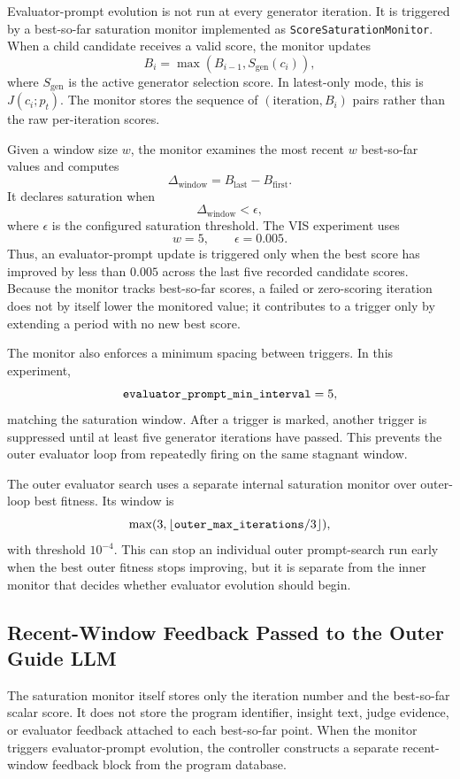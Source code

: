 \documentclass[11pt]{article}
\begin{document}
Evaluator-prompt evolution is not run at every generator iteration. It is
triggered by a best-so-far saturation monitor implemented as
\texttt{ScoreSaturationMonitor}. When a child candidate receives a valid score,
the monitor updates
\[
  B_i = \max(B_{i-1}, S_{\mathrm{gen}}(c_i)),
\]
where \(S_{\mathrm{gen}}\) is the active generator selection score. In
latest-only mode, this is \(J(c_i; p_t)\). The monitor stores the sequence of
\((\text{iteration}, B_i)\) pairs rather than the raw per-iteration scores.

Given a window size \(w\), the monitor examines the most recent \(w\)
best-so-far values and computes
\[
  \Delta_{\mathrm{window}}
    = B_{\mathrm{last}} - B_{\mathrm{first}}.
\]
It declares saturation when
\[
  \Delta_{\mathrm{window}} < \epsilon,
\]
where \(\epsilon\) is the configured saturation threshold. The VIS experiment
uses
\[
  w = 5,\qquad \epsilon = 0.005.
\]
Thus, an evaluator-prompt update is triggered only when the best score has
improved by less than \(0.005\) across the last five recorded candidate scores.
Because the monitor tracks best-so-far scores, a failed or zero-scoring
iteration does not by itself lower the monitored value; it contributes to a
trigger only by extending a period with no new best score.

The monitor also enforces a minimum spacing between triggers. In this
experiment,
\[
  \text{\texttt{evaluator\_prompt\_min\_interval}} = 5,
\]
matching the saturation window. After a trigger is marked, another trigger is
suppressed until at least five generator iterations have passed. This prevents
the outer evaluator loop from repeatedly firing on the same stagnant window.

The outer evaluator search uses a separate internal saturation monitor over
outer-loop best fitness. Its window is
\[
  \max(3,\lfloor \text{\texttt{outer\_max\_iterations}}/3 \rfloor),
\]
with threshold \(10^{-4}\). This can stop an individual outer prompt-search run
early when the best outer fitness stops improving, but it is separate from the
inner monitor that decides whether evaluator evolution should begin.

\subsection{Recent-Window Feedback Passed to the Outer Guide LLM}

The saturation monitor itself stores only the iteration number and the
best-so-far scalar score. It does not store the program identifier, insight text,
judge evidence, or evaluator feedback attached to each best-so-far point. When
the monitor triggers evaluator-prompt evolution, the controller constructs a
separate recent-window feedback block from the program database.
\end{document}
